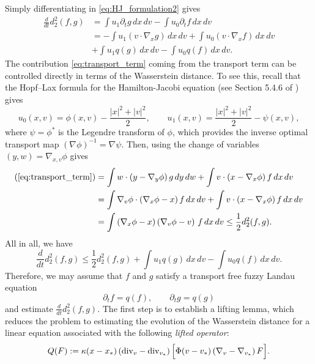 \documentclass[10pt,oneside]{amsart}
\numberwithin{equation}{section}
\numberwithin{definition}{section}
\numberwithin{theorem}{section}
\numberwithin{lemma}{section}
\begin{document}
%
Simply differentiating in \cref{eq:HJ_formulation2} gives
% 
\begin{align}
  \frac{d}{dt}d_{2}^{2}(f,g) & =\int u_1\partial_{t}g\,dx\,dv-\int u_0\partial_{t}f\,dx\,dv	\nonumber\\
  & =-\int u_1\left(v\cdot\nabla_{x}g\right)\,dx\,dv+\int u_0\left(v\cdot\nabla_{x}f\right)\,dx\,dv \label{eq:transport_term}\\
  & +\int u_1q(g)\,dx\,dv-\int u_0q(f)\,dx\,dv\label{eq:collision_term}.
\end{align}
%
The contribution \eqref{eq:transport_term} coming from the transport term can be controlled directly in terms of the Wasserstein distance. To see this, recall that the Hopf–Lax formula for the Hamilton-Jacobi equation (see Section 5.4.6 of \cite{villani2003topicsOT}) gives
% 
\begin{equation*}
  u_0(x,v)=\phi(x,v)-\frac{|x|^{2}+|v|^{2}}{2},\qquad u_1(x,v)=\frac{|x|^{2}+|v|^{2}}{2}-\psi(x,v),
\end{equation*}
%
where $\psi = \phi^*$ is the Legendre transform of $\phi$, which provides the inverse optimal transport map $(\nabla \phi)^{-1} = \nabla \psi$. Then, using the change of variables $(y,w)=\nabla_{x,v}\phi$ gives
%
\begin{align*}
  (\ref{eq:transport_term}) & =\int w\cdot\left(y-\nabla_{y}\phi\right)g\,dy\,dw+\int v\cdot\left(x-\nabla_{x}\phi\right)f\,dx\,dv \\
  & =\int\nabla_{v}\phi\cdot\left(\nabla_{x}\phi-x\right)f\,dx\,dv+\int v\cdot\left(x-\nabla_{x}\phi\right)f\,dx\,dv\\
  & =\int\left(\nabla_{x}\phi-x\right)\left(\nabla_{v}\phi-v\right)\,f\,dx\,dv\leq\frac{1}{2}d_{2}^{2}(f,g).
\end{align*}
%
All in all, we have
%
\begin{equation*}
  \frac{d}{dt}d_{2}^{2}(f,g) \leq \frac{1}{2}d_2^2(f,g)
  +\int u_1q(g)\,dx\,dv-\int u_0q(f)\,dx\,dv.
\end{equation*}
%
Therefore, we may assume that $f$ and $g$ satisfy a transport free fuzzy Landau equation
%
\begin{equation}\label{eq:transport_free}
  \partial_t f = q(f),
  \qquad \partial_tg = q(g)
\end{equation}
%
and estimate $\frac{d}{dt}d_2^2(f,g)$. The first step is to establish a lifting lemma, which reduces the problem to estimating the evolution of the Wasserstein distance for a linear equation associated with the following \emph{lifted operator}:
% 
\begin{equation*}
  Q(F):=\kappa(x-x_*)\left(\textnormal{div}_{v}-\textnormal{div}_{v_*}\right)\Big[\Phi(v-v_*)\left(\nabla_{v}-\nabla_{v_*}\right)F\Big].
\end{equation*}
\end{document}
